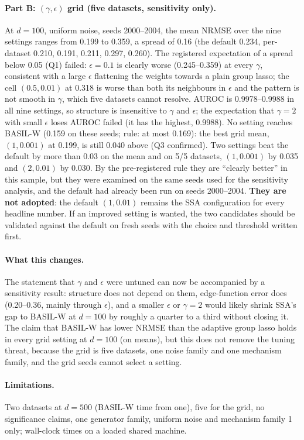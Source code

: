 \paragraph{Part B: $(\gamma,\epsilon)$ grid (five datasets, sensitivity only).} At $d=100$, uniform noise, seeds 2000--2004, the mean NRMSE over the nine settings ranges from 0.199 to 0.359, a spread of 0.16 (the default 0.234, per-dataset 0.210, 0.191, 0.211, 0.297, 0.260). The registered expectation of a spread below 0.05 (Q1) failed: $\epsilon=0.1$ is clearly worse (0.245--0.359) at every $\gamma$, consistent with a large $\epsilon$ flattening the weights towards a plain group lasso; the cell $(0.5,0.01)$ at 0.318 is worse than both its neighbours in $\epsilon$ and the pattern is not smooth in $\gamma$, which five datasets cannot resolve. AUROC is 0.9978--0.9988 in all nine settings, so structure is insensitive to $\gamma$ and $\epsilon$; the expectation that $\gamma=2$ with small $\epsilon$ loses AUROC failed (it has the highest, 0.9988). No setting reaches BASIL-W (0.159 on these seeds; rule: at most 0.169): the best grid mean, $(1,0.001)$ at 0.199, is still 0.040 above (Q3 confirmed). Two settings beat the default by more than 0.03 on the mean and on 5/5 datasets, $(1,0.001)$ by 0.035 and $(2,0.01)$ by 0.030. By the pre-registered rule they are ``clearly better'' in this sample, but they were examined on the same seeds used for the sensitivity analysis, and the default had already been run on seeds 2000--2004. \textbf{They are not adopted}: the default $(1,0.01)$ remains the SSA configuration for every headline number. If an improved setting is wanted, the two candidates should be validated against the default on fresh seeds with the choice and threshold written first.

\paragraph{What this changes.} The statement that $\gamma$ and $\epsilon$ were untuned can now be accompanied by a sensitivity result: structure does not depend on them, edge-function error does (0.20--0.36, mainly through $\epsilon$), and a smaller $\epsilon$ or $\gamma=2$ would likely shrink SSA's gap to BASIL-W at $d=100$ by roughly a quarter to a third without closing it. The claim that BASIL-W has lower NRMSE than the adaptive group lasso holds in every grid setting at $d=100$ (on means), but this does not remove the tuning threat, because the grid is five datasets, one noise family and one mechanism family, and the grid seeds cannot select a setting.

\paragraph{Limitations.} Two datasets at $d=500$ (BASIL-W time from one), five for the grid, no significance claims, one generator family, uniform noise and mechanism family 1 only; wall-clock times on a loaded shared machine.
